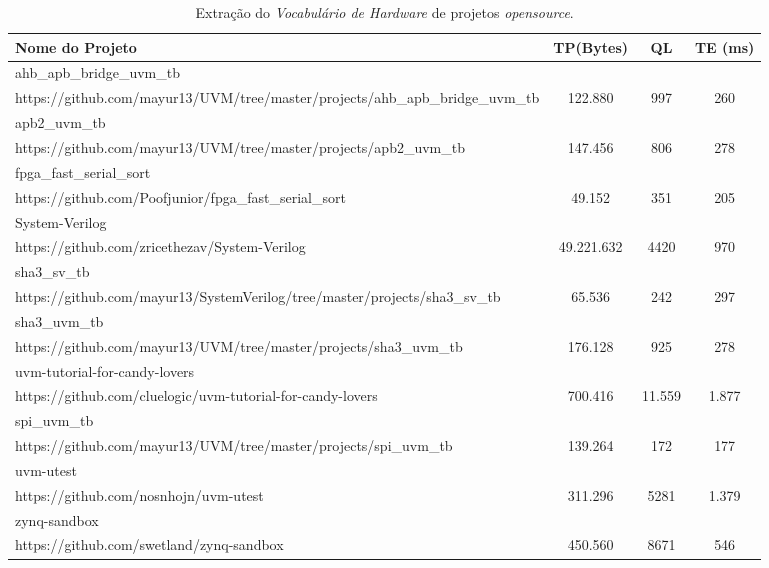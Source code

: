 \documentclass[12pt, twocolumn, a4paper]{article}
\begin{document}
\begin{table*}[h]
\centering
\caption{Extração do \textit{Vocabulário de Hardware} de projetos \textit{opensource}.}
	\begin{tabular}{l|c|c|c}
	\hline
	Nome do Projeto & TP(Bytes)& QL & TE (ms)\\
	\hline
	ahb\_apb\_bridge\_uvm\_tb&&&\\{\footnotesize https://github.com/mayur13/UVM/tree/master/projects/ahb\_apb\_bridge\_uvm\_tb}& 122.880 & 997 & 260\\

	\hline
	apb2\_uvm\_tb&&&\\{\footnotesize https://github.com/mayur13/UVM/tree/master/projects/apb2\_uvm\_tb}     & 147.456 & 806 & 278\\
	\hline
	fpga\_fast\_serial\_sort&&&\\{\footnotesize https://github.com/Poofjunior/fpga\_fast\_serial\_sort} 	   & 49.152 & 351 & 205\\
	\hline
	System-Verilog&&&\\{\footnotesize https://github.com/zricethezav/System-Verilog}   & 49.221.632 & 4420 & 970\\
	\hline
	sha3\_sv\_tb&&&\\{\footnotesize https://github.com/mayur13/SystemVerilog/tree/master/projects/sha3\_sv\_tb}       & 65.536 & 242 & 297 \\
	\hline
	sha3\_uvm\_tb&&&\\{\footnotesize https://github.com/mayur13/UVM/tree/master/projects/sha3\_uvm\_tb}& 176.128 & 925 & 278\\
	\hline
	uvm-tutorial-for-candy-lovers&&&\\{\footnotesize https://github.com/cluelogic/uvm-tutorial-for-candy-lovers}  & 700.416 & 11.559 & 1.877\\
	\hline
	spi\_uvm\_tb&&&\\{\footnotesize https://github.com/mayur13/UVM/tree/master/projects/spi\_uvm\_tb}      & 139.264 & 172 & 177\\
	\hline
	uvm-utest&&&\\{\footnotesize https://github.com/nosnhojn/uvm-utest}& 311.296 & 5281 & 1.379\\
	\hline
	zynq-sandbox&&&\\{\footnotesize https://github.com/swetland/zynq-sandbox}& 450.560 & 8671 & 546\\
	\hline
	\end{tabular}

\end{table*}		
	
\end{document}
